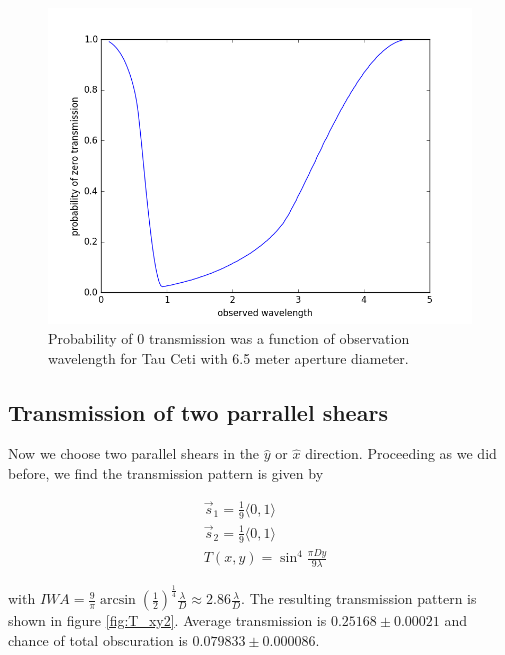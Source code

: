 \documentclass{article}
\begin{document}
	\begin{figure}
		\includegraphics[width = \linewidth]{z_pi_wl.png}
		\caption{Probability of 0 transmission was a function of observation wavelength for Tau Ceti with 6.5 meter aperture diameter.}
		\label{fig:z v wl}
	\end{figure}
	
	\subsection{Transmission of two parrallel shears}
	Now we choose two parallel shears in the $\hat{y}$ or $\hat{x}$ direction. Proceeding as we did before, we find the transmission pattern is given by 
	
	\begin{align}
	&\vec{s}_1 = \frac{1}{9} \langle 0,1 \rangle \\
	&\vec{s}_2 = \frac{1}{9} \langle 0,1 \rangle \\
	&T(x,y) = \sin^4{\frac{\pi D y}{9 \lambda}}
	\end{align}

with $IWA = \frac{9}{\pi}\arcsin{\left(\frac{1}{2}\right)^{\frac{1}{4}}} \frac{\lambda}{D} \approx 2.86 \frac{\lambda}{D}$. The resulting transmission pattern is shown in figure \ref{fig:T_xy2}. Average transmission is $0.25168 \pm 0.00021$ and chance of total obscuration is $0.079833 \pm 0.000086$.
	
\end{document}
